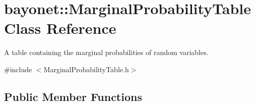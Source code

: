 \hypertarget{classbayonet_1_1_marginal_probability_table}{\section{bayonet\-:\-:Marginal\-Probability\-Table Class Reference}
\label{classbayonet_1_1_marginal_probability_table}
}


A table containing the marginal probabilities of random variables.  




{\ttfamily \#include $<$Marginal\-Probability\-Table.\-h$>$}

\subsection*{Public Member Functions}
